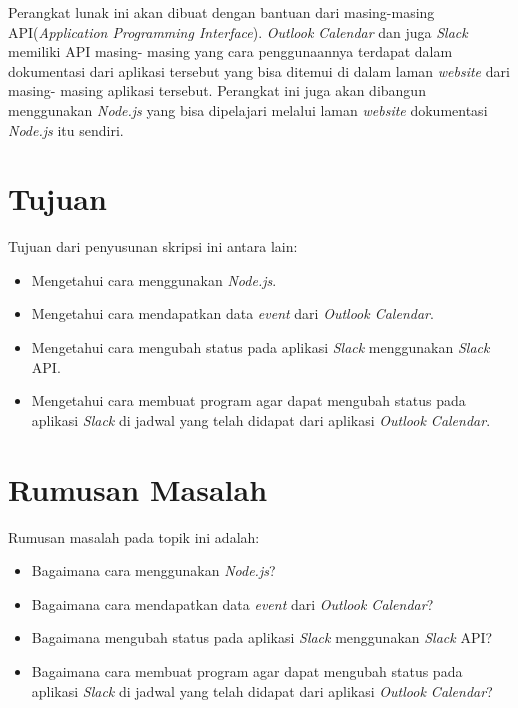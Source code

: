 \documentclass[a4paper,twoside]{article}
\begin{document}
Perangkat lunak ini akan dibuat dengan bantuan dari masing-masing API(\textit{Application Programming Interface}). \textit{Outlook Calendar} dan juga \textit{Slack} memiliki API masing- masing yang cara penggunaannya terdapat dalam dokumentasi dari aplikasi tersebut yang bisa ditemui di dalam laman \textit{website} dari masing- masing aplikasi tersebut. Perangkat ini juga akan dibangun menggunakan \textit{Node.js} yang bisa dipelajari melalui laman \textit{website} dokumentasi \textit{Node.js} itu sendiri. 

\section{Tujuan}
Tujuan dari penyusunan skripsi ini antara lain:
\begin{itemize}
	\item Mengetahui cara menggunakan \textit{Node.js}. 
	\item Mengetahui cara mendapatkan data \textit{event} dari \textit{Outlook Calendar}.   
	\item Mengetahui cara mengubah status pada aplikasi \textit{Slack} menggunakan \textit{Slack} API. 
	\item Mengetahui cara membuat program agar dapat mengubah status pada aplikasi \textit{Slack} di jadwal yang telah didapat dari aplikasi \textit{Outlook Calendar}.  
	
\end{itemize}

\section{Rumusan Masalah}
Rumusan masalah pada topik ini adalah:
\begin{itemize}
	\item Bagaimana cara menggunakan \textit{Node.js}?
	\item Bagaimana cara mendapatkan data \textit{event} dari \textit{Outlook Calendar}?
	\item Bagaimana mengubah status pada aplikasi \textit{Slack} menggunakan \textit{Slack} API?  
	\item Bagaimana cara membuat program agar dapat mengubah status pada aplikasi \textit{Slack} di jadwal yang telah didapat dari aplikasi \textit{Outlook Calendar}? 
	
\end{itemize}
\end{document}
